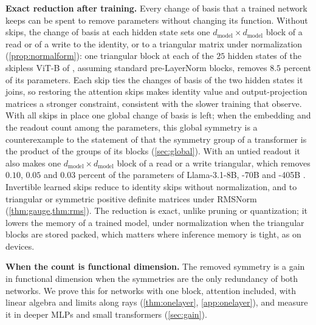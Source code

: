 \documentclass[10pt]{article}
\theoremstyle{definition}
\theoremstyle{remark}
\newcommand{\dm}{d_{\mathrm{model}}}
\newcommand{\para}[1]{\smallskip\noindent\textbf{#1}\hspace{0.5em}}
\begin{document}
\para{Exact reduction after training.} Every change of basis that a trained network keeps can be spent to remove parameters without changing its function. Without skips, the change of basis at each hidden state sets one $\dm \times \dm$ block of a read or of a write to the identity, or to a triangular matrix under normalization (\cref{prop:normalform}): one triangular block at each of the $25$ hidden states of the skipless ViT-B of \citet{ji2026cutting}, assuming standard pre-LayerNorm blocks, removes $8.5$ percent of its parameters. Each skip ties the changes of basis of the two hidden states it joins, so restoring the attention skips makes identity value and output-projection matrices a stronger constraint, consistent with the slower training that \citet{he2024simplifying} observe. With all skips in place one global change of basis is left; when the embedding and the readout count among the parameters, this global symmetry is a counterexample to the statement of \citet{wang2025gauge} that the symmetry group of a transformer is the product of the groups of its blocks (\cref{sec:global}). With an untied readout it also makes one $\dm \times \dm$ block of a read or a write triangular, which removes $0.10$, $0.05$ and $0.03$ percent of the parameters of Llama-3.1-8B, -70B and -405B \citep{grattafiori2024llama3}. Invertible learned skips reduce to identity skips without normalization, and to triangular or symmetric positive definite matrices under RMSNorm (\cref{thm:gauge,thm:rms}). The reduction is exact, unlike pruning or quantization; it lowers the memory of a trained model, under normalization when the triangular blocks are stored packed, which matters where inference memory is tight, as on devices.

\para{When the count is functional dimension.} The removed symmetry is a gain in functional dimension when the symmetries are the only redundancy of both networks. We prove this for networks with one block, attention included, with linear algebra and limits along rays (\cref{thm:onelayer}, \cref{app:onelayer}), and measure it in deeper MLPs and small transformers (\cref{sec:gain}).
\end{document}
